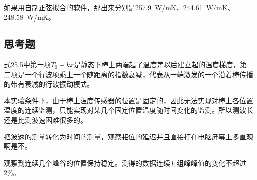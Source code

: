\documentclass[UTF8]{ctexart}
\begin{document}
\begin{figure}[h]
  \centering
  \hfill
  \hfill
  \\
\end{figure}

如果用自制正弦拟合的软件，那出来分别是\SI{257.9}{W/mK}、\SI{244.61}{W/mK}、\SI{248.58}{W/mK}。
\subsection{思考题}
式25.5中第一项$T_0-kx$是静态下棒上两端起了温度差以后建立起的温度梯度，第二项是一个行波项乘上一个随距离的指数衰减，代表从一端激发的一个沿着棒传播的带有衰减的行波振动模式。

本实验条件下，由于棒上温度传感器的位置是固定的，因此无法实现对棒上各位置温度的连续监测，只能实现对某几个固定位置温度随时间变化的监测。所以测波长还是比测波速困难很多的。

把波速的测量转化为时间的测量，观察相位的延迟并且直接打在电脑屏幕上多直观啊是不。

观察到连续几个峰谷的位置保持稳定。测得的数据连续五组峰峰值的变化不超过2\%。
\end{document}
